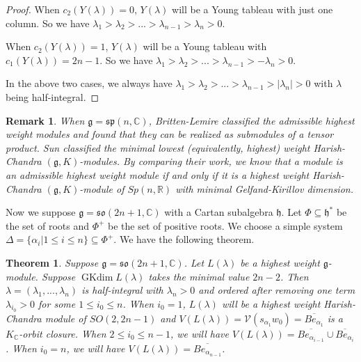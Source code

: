 \documentclass{amsart}[12pt]
\newtheorem{Thm}[Lem]{Theorem}
\newtheorem{Rem}{Remark}[section]
\renewcommand{\subset}{\subseteq}
\newcommand{\gkd}{\operatorname{GKdim}}
\numberwithin{equation}{section}
\begin{document}
\begin{proof}
When $c_2(Y(\lambda))=0$, $Y(\lambda)$ will be a Young tableau with just one column. So we have $\lambda_1>\lambda_2>...>\lambda_{n-1}>\lambda_n>0$.

When $c_2(Y(\lambda))=1$, $Y(\lambda)$ will be a Young tableau with $c_1(Y(\lambda))=2n-1$. So we have
$\lambda_1>\lambda_2>...>\lambda_{n-1}>-\lambda_n>0$.

In the above two cases, we always have $\lambda_1>\lambda_2>...>\lambda_{n-1}>|\lambda_n|>0$ with $\lambda$ being half-integral.

\end{proof}

\begin{Rem}
		When $\mathfrak{g}=\mathfrak{sp}(n, \mathbb{C})$, Britten-Lemire \cite{BL} classified the  admissible highest weight modules and found that they can be realized as submodules of a tensor product. Sun \cite{Sun} classified the minimal lowest (equivalently, highest) weight Harish-Chandra $(\mathfrak{g}, K)$-modules. By comparing their work, we know that a module is an admissible highest weight module if and only if it is a highest weight Harish-Chandra $(\mathfrak{g}, K)$-module of $Sp(n, \mathbb{R})$ with minimal Gelfand-Kirillov dimension.
	
\end{Rem}
%



Now	we suppose $\mathfrak{g}=\mathfrak{so}(2n+1, \mathbb{C})$ with a Cartan subalgebra $\mathfrak{h}$. Let $\Phi\subseteq \mathfrak{h}^*$ be the set of roots and $\Phi^+$ be the set of positive roots. We choose  a simple system $\Delta=\{\alpha_i|1\leq i\leq n\}\subset\Phi^+$. We have the following theorem.

\begin{Thm}
	Suppose $\mathfrak{g}=\mathfrak{so }(2n+1, \mathbb{C})$. Let $L(\lambda)$ be a highest weight $\mathfrak{g}$-module. Suppose $\gkd L(\lambda)$ takes the minimal value $2n-2$. Then
	$\lambda=(\lambda_1,...,\lambda_n)$ is half-integral with $\lambda_n>0$ and ordered  after removing one term $\lambda_{i_0}>0$ for some $1\leq i_0\leq n$. When ${i_0}=1$, $L(\lambda)$ will be a highest weight Harish-Chandra module of $SO(2, 2n-1)$ and $V(L(\lambda))=\mathcal{V}(s_{\alpha_{1}}w_0)=\overline{Be_{\alpha_{1}}}$ is a $K_{\mathbb{C}}$-orbit closure.
	When $2\leq i_0\leq n-1$, we will have $V(L(\lambda))=\overline{Be_{\alpha_{i-1}}}\cup \overline{Be_{\alpha_{i}}}$.  When $ i_0=n$,  we will have $V(L(\lambda))=\overline{Be_{\alpha_{n-1}}}$.
	
	
\end{Thm}
\end{document}
